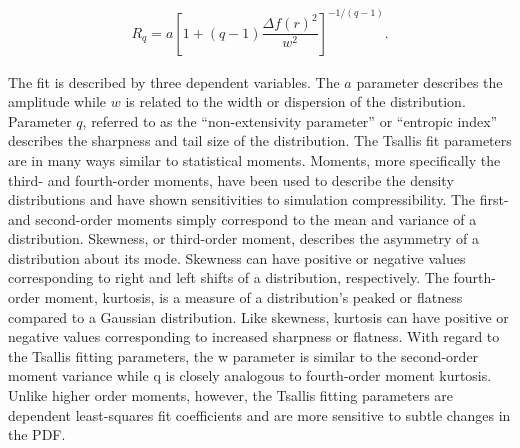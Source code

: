 \documentclass[a4paper,11pt]{article}
\begin{document}
\begin{align*}
    R_q = a \left[ 1+(q-1) \dfrac{\Delta f(r)^2}{w^2} \right]^{-1/(q-1)}.
\end{align*}

{\noindent}The fit is described by three dependent variables. The $a$ parameter describes the amplitude while $w$ is related to the width or dispersion of the distribution. Parameter $q$, referred to as the ``non-extensivity parameter'' or ``entropic index'' describes the sharpness and tail size of the distribution. The Tsallis fit parameters are in many ways similar to statistical moments. Moments, more specifically the third- and fourth-order moments, have been used to describe the density distributions and have shown sensitivities to simulation compressibility. The first- and second-order moments simply correspond to the mean and variance of a distribution. Skewness, or third-order moment, describes the asymmetry of a distribution about its mode. Skewness can have positive or negative values corresponding to right and left shifts of a distribution, respectively. The fourth-order moment, kurtosis, is a measure of a distribution’s peaked or flatness compared to a Gaussian distribution. Like skewness, kurtosis can have positive or negative values corresponding to increased sharpness or flatness. With regard to the Tsallis fitting parameters, the w parameter is similar to the second-order moment variance while q is closely analogous to fourth-order moment kurtosis. Unlike higher order moments, however, the Tsallis fitting parameters are dependent least-squares fit coefficients and are more sensitive to subtle changes in the PDF.
\end{document}
